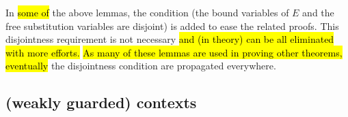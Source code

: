 In \hl{some of} the above lemmas, the condition
 (the bound
variables of $E$ and the free substitution variables are disjoint) is
added to ease the related proofs. This disjointness requirement
is not necessary \hl{and (in theory) can be all eliminated with more efforts.}
\hl{As many of these lemmas are used in proving other theorems, eventually}
the disjointness condition are propagated everywhere.

\subsection{\Multivariate (weakly guarded) contexts}

